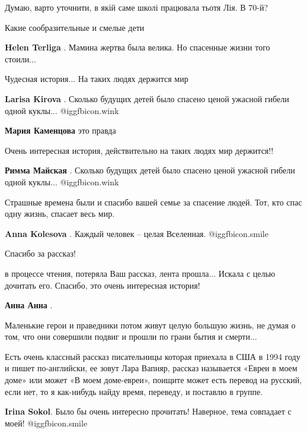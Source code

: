 \begin{itemize}
\begin{itemize}
Думаю, варто уточнити, в якій саме школі працювала тьотя Лія. В 70-й?

\end{itemize} %

Какие сообразительные и смелые дети

\textbf{Helen Terliga} . Мамина жертва была велика. Но спасенные жизни того стоили...

Чудесная история... На таких людях держится мир

\begin{itemize} %
\textbf{Larisa Kirova} . Сколько будущих детей было спасено ценой ужасной гибели одной куклы...  @igg{fbicon.wink} 

\textbf{Мария Каменцова} это правда
\end{itemize} %

Очень интересная история, действительно на таких людях мир держится!!

\textbf{Римма Майская} . Сколько будущих детей было спасено ценой ужасной гибели одной куклы...  @igg{fbicon.wink} 

Страшные времена были и спасибо вашей семье за спасение людей. Тот, кто спас одну жизнь, спасает весь мир.

\textbf{Anna Kolesova} . Каждый человек – целая Вселенная.  @igg{fbicon.smile} 

Спасибо за рассказ!


в процессе чтения, потеряла Ваш рассказ, лента прошла... Искала с целью
дочитать его. Спасибо, это очень интересная история!

\textbf{Анна Анна} . 

Маленькие герои и праведники потом живут целую большую жизнь, не думая о том,
что они совершили подвиг и прошли по грани бытия и смерти...


Есть очень классный рассказ писательницы которая приехала в США в 1994 году и
пишет по-английски, ее зовут Лара Вапняр, рассказ называется «Евреи в моем
доме» или может «В моем доме-евреи», поищите может есть перевод на русский,
если нет, то я как-нибудь найду время, переведу, и поставлю в группе.

\begin{itemize} %
\textbf{Irina Sokol}. Было бы очень интересно прочитать! Наверное, тема совпадает с моей!  @igg{fbicon.smile} 


\end{itemize}
\end{itemize}
